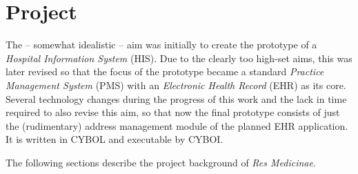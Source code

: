 %
%
%
%
%
%
%

\section{Project}
\label{project_heading}

The -- somewhat idealistic -- aim was initially to create the prototype of a
\emph{Hospital Information System} (HIS). Due to the clearly too high-set aims,
this was later revised so that the focus of the prototype became a standard
\emph{Practice Management System} (PMS) with an \emph{Electronic Health Record}
(EHR) as its core. Several technology changes during the progress of this work
and the lack in time required to also revise this aim, so that now the final
prototype consists of just the (rudimentary) address management module of the
planned EHR application. It is written in CYBOL and executable by CYBOI.

The following sections describe the project background of \emph{Res Medicinae}.





